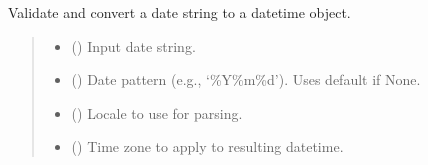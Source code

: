 \documentclass[letterpaper,10pt,english]{sphinxmanual}
\begin{document}
\begin{fulllineitems}
\begin{fulllineitems}
\label{\detokenize{apache_commons_validator_python.routines:apache_commons_validator_python.routines.date_validator.DateValidator.validate}}
\pysigstartsignatures
{}
\pysigstopsignatures
\sphinxAtStartPar
Validate and convert a date string to a datetime object.
\begin{quote}\begin{description}
\begin{itemize}
\item {} 
\sphinxAtStartPar
{} () \textendash{} Input date string.

\item {} 
\sphinxAtStartPar
{} (\sphinxstyleliteralemphasis{\sphinxupquote{{[}}}\sphinxstyleliteralemphasis{\sphinxupquote{{]}}}) \textendash{} Date pattern (e.g., ‘\%Y\sphinxhyphen{}\%m\sphinxhyphen{}\%d’). Uses default if None.

\item {} 
\sphinxAtStartPar
{} (\sphinxstyleliteralemphasis{\sphinxupquote{{[}}}\sphinxstyleliteralemphasis{\sphinxupquote{{]}}}) \textendash{} Locale to use for parsing.

\item {} 
\sphinxAtStartPar
{} (\sphinxstyleliteralemphasis{\sphinxupquote{{[}}}\sphinxstyleliteralemphasis{\sphinxupquote{{]}}}) \textendash{} Time zone to apply to resulting datetime.


\end{itemize}
\end{description}
\end{quote}
\end{fulllineitems}
\end{fulllineitems}
\end{document}
